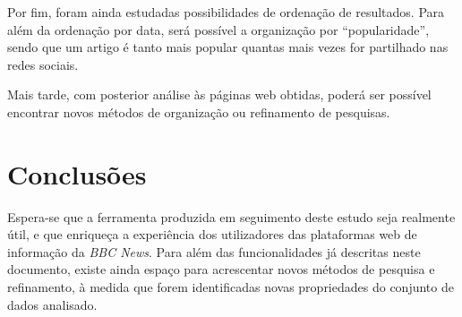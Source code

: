\documentclass[twocolumn,twoside,10pt,a4paper]{article}
\begin{document}
Por fim, foram ainda estudadas possibilidades de ordenação de resultados. Para além da ordenação por data, será possível a organização por “popularidade”, sendo que um artigo é tanto mais popular quantas mais vezes for partilhado nas redes sociais. 

Mais tarde, com posterior análise às páginas web obtidas, poderá ser possível encontrar novos métodos de organização ou refinamento de pesquisas.

\section{Conclusões}\label{sec:conclude}

Espera-se que a ferramenta produzida em seguimento deste estudo seja realmente útil, e que enriqueça a experiência dos utilizadores das plataformas web de informação da \textit{BBC News}. Para além das funcionalidades já descritas neste documento, existe ainda espaço para acrescentar novos métodos de pesquisa e refinamento, à medida que forem identificadas novas propriedades do conjunto de dados analisado.



\end{document}
